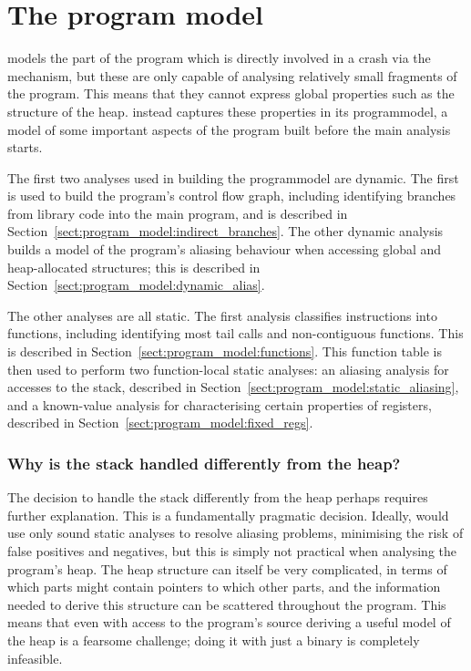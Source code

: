 \chapter{The program model}

{\Technique} models the part of the program which is directly involved
in a crash via the {\StateMachine} mechanism, but these are only
capable of analysing relatively small fragments of the program.  This
means that they cannot express global properties such as the structure
of the heap.  {\Technique} instead captures these properties in its
\gls{programmodel}, a model of some important aspects of the program
built before the main analysis starts.

The first two analyses used in building the \gls{programmodel} are
dynamic.  The first is used to build the program's control flow graph,
including identifying branches from library code into the main
program, and is described in
Section~\ref{sect:program_model:indirect_branches}.  The other dynamic
analysis builds a model of the program's aliasing behaviour when
accessing global and heap-allocated structures; this is described in
Section~\ref{sect:program_model:dynamic_alias}.

The other analyses are all static.  The first analysis classifies
instructions into functions, including identifying most tail calls and
non-contiguous functions. This is described in
Section~\ref{sect:program_model:functions}.  This function table is
then used to perform two function-local static analyses: an aliasing
analysis for accesses to the stack, described in
Section~\ref{sect:program_model:static_aliasing}, and a known-value
analysis for characterising certain properties of registers, described
in Section~\ref{sect:program_model:fixed_regs}.

\subsection{Why is the stack handled differently from the heap?}

The decision to handle the stack differently from the heap perhaps
requires further explanation.  This is a fundamentally pragmatic
decision.  Ideally, {\technique} would use only sound static analyses
to resolve aliasing problems, minimising the risk of false positives
and negatives, but this is simply not practical when analysing the
program's heap.  The heap structure can itself be very complicated, in
terms of which parts might contain pointers to which other parts, and
the information needed to derive this structure can be scattered
throughout the program.  This means that even with access to the
program's source deriving a useful model of the heap is a fearsome
challenge\needCite{}; doing it with just a binary is completely
infeasible.

